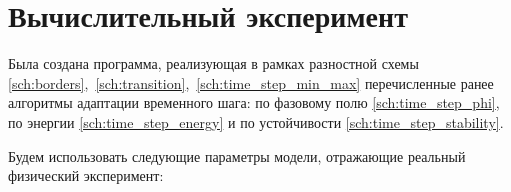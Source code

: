 
\section{Вычислительный эксперимент}

Была создана программа, реализующая в рамках разностной схе\forcehyphenation мы \eqref{sch:borders},~\eqref{sch:transition},~\eqref{sch:time_step_min_max} перечисленные ранее алгоритмы адаптации временного шага: по фазовому полю \eqref{sch:time_step_phi}, по энергии \eqref{sch:time_step_energy} и по устойчивости \eqref{sch:time_step_stability}.

Будем использовать следующие параметры модели, отражающие реальный физический эксперимент: